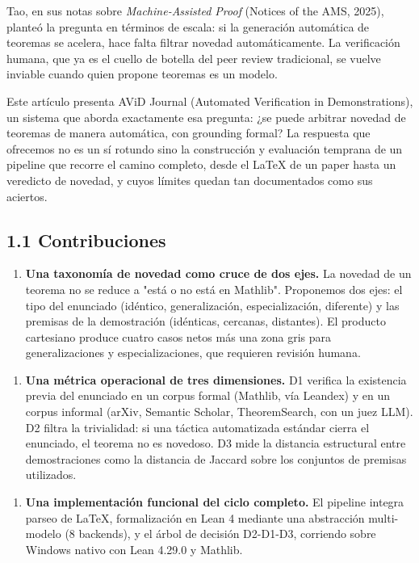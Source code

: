 \documentclass[12pt,a4paper]{article}
\theoremstyle{remark}
\begin{document}
Tao, en sus notas sobre \textit{Machine-Assisted Proof} (Notices of the AMS, 2025), planteó la pregunta en términos de escala: si la generación automática de teoremas se acelera, hace falta filtrar novedad automáticamente. La verificación humana, que ya es el cuello de botella del peer review tradicional, se vuelve inviable cuando quien propone teoremas es un modelo.


Este artículo presenta AViD Journal (Automated Verification in Demonstrations), un sistema que aborda exactamente esa pregunta: ¿se puede arbitrar novedad de teoremas de manera automática, con grounding formal? La respuesta que ofrecemos no es un sí rotundo sino la construcción y evaluación temprana de un pipeline que recorre el camino completo, desde el LaTeX de un paper hasta un veredicto de novedad, y cuyos límites quedan tan documentados como sus aciertos.


\subsection{1.1 Contribuciones}

\begin{enumerate}
\item \textbf{Una taxonomía de novedad como cruce de dos ejes.} La novedad de un teorema no se reduce a "está o no está en Mathlib". Proponemos dos ejes: el tipo del enunciado (idéntico, generalización, especialización, diferente) y las premisas de la demostración (idénticas, cercanas, distantes). El producto cartesiano produce cuatro casos netos más una zona gris para generalizaciones y especializaciones, que requieren revisión humana.
\end{enumerate}


\begin{enumerate}
\item \textbf{Una métrica operacional de tres dimensiones.} D1 verifica la existencia previa del enunciado en un corpus formal (Mathlib, vía Leandex) y en un corpus informal (arXiv, Semantic Scholar, TheoremSearch, con un juez LLM). D2 filtra la trivialidad: si una táctica automatizada estándar cierra el enunciado, el teorema no es novedoso. D3 mide la distancia estructural entre demostraciones como la distancia de Jaccard sobre los conjuntos de premisas utilizados.
\end{enumerate}


\begin{enumerate}
\item \textbf{Una implementación funcional del ciclo completo.} El pipeline integra parseo de LaTeX, formalización en Lean 4 mediante una abstracción multi-modelo (8 backends), y el árbol de decisión D2-D1-D3, corriendo sobre Windows nativo con Lean 4.29.0 y Mathlib.
\end{enumerate}
\end{document}
